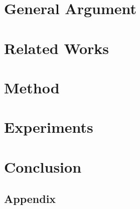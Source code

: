 \documentclass[11pt]{article}
\begin{document}
\section{General Argument}\label{sec:generalargument}


\section{Related Works}\label{sec:relatedworks}

\section{Method}\label{sec:method}

\section{Experiments}\label{sec:experiments}

\section{Conclusion}\label{sec:conclusion}



\begin{appendix}
    \section*{Appendix}
\end{appendix}
\end{document}
